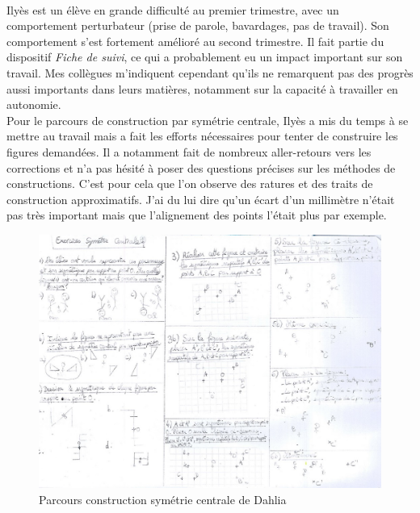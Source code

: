 \paragraph{}Ilyès est un élève en grande difficulté au premier trimestre, avec un comportement perturbateur (prise de parole, bavardages, pas de travail). Son comportement s'est fortement amélioré au second trimestre. Il fait partie du dispositif \textit{Fiche de suivi}, ce qui a probablement eu un impact important sur son travail. Mes collègues m'indiquent cependant qu'ils ne remarquent pas des progrès aussi importants dans leurs matières, notamment sur la capacité à travailler en autonomie.\\
Pour le parcours de construction par symétrie centrale, Ilyès a mis du temps à se mettre au travail mais a fait les efforts nécessaires pour tenter de construire les figures demandées. Il a notamment fait de nombreux aller-retours vers les corrections et n'a pas hésité à poser des questions précises sur les méthodes de constructions. C'est pour cela que l'on observe des ratures et des traits de construction approximatifs. J'ai du lui dire qu'un écart d'un millimètre n'était pas très important mais que l'alignement des points l'était plus par exemple.
\begin{figure}[!h]
	\centering
	\includegraphics[scale=0.4]{img/symetrie_Dahlia.jpg}
	\caption{Parcours construction symétrie centrale de Dahlia}
\end{figure}
